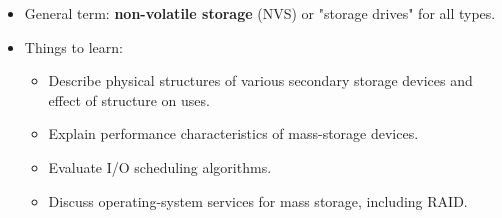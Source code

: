 \begin{itemize}
    \item General term: \textbf{non-volatile storage} (NVS) or "storage drives" for all types.
\item Things to learn:
    \begin{itemize}
        \item Describe physical structures of various secondary storage devices and effect of structure on uses.
        \item Explain performance characteristics of mass-storage devices.
        \item Evaluate I/O scheduling algorithms.
        \item Discuss operating-system services for mass storage, including RAID.
    \end{itemize}
\end{itemize}

